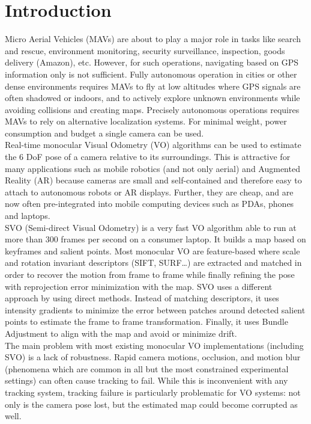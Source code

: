 \chapter{Introduction}\label{sec:introduction}

Micro Aerial Vehicles (MAVs) are about to play a major role in tasks like search and rescue, environment monitoring, security surveillance, inspection, goods delivery (Amazon), etc.  However, for such operations, navigating based on GPS information only is not sufficient. Fully autonomous operation in cities or other dense environments requires MAVs to fly at low altitudes where GPS signals are often shadowed or indoors, and to actively explore unknown environments while avoiding collisions and creating maps. Precisely autonomous operations requires MAVs to rely on alternative localization systems. For minimal weight, power consumption and budget a single camera can be used.\\

Real-time monocular Visual Odometry (VO) algorithms can be used to estimate the 6 DoF pose of a camera relative to its surroundings. This is attractive for many applications such as mobile robotics (and not only aerial) and Augmented Reality (AR) because cameras are small and self-contained and therefore easy to attach to autonomous robots or AR displays. Further, they are cheap, and are now often pre-integrated into mobile computing devices such as PDAs, phones and laptops.\\

SVO (Semi-direct Visual Odometry) \cite{Forster2014} is a very fast VO algorithm able to run at more than 300 frames per second on a consumer laptop. It builds a map based on keyframes and salient points. Most monocular VO are feature-based where scale and rotation invariant descriptors (SIFT, SURF\ldots) are extracted and matched in order to recover the motion from frame to frame while finally refining the pose with reprojection error minimization with the map. SVO uses a different approach by using direct methods. Instead of matching descriptors, it uses intensity gradients to minimize the error between patches around detected salient points to estimate the frame to frame transformation. Finally, it uses Bundle Adjustment to align with the map and avoid or minimize drift.\\

The main problem with most existing monocular VO implementations (including SVO) is a lack of robustness. Rapid camera motions, occlusion, and motion blur (phenomena which are common in all but the most constrained experimental settings) can often cause tracking to fail. While this is inconvenient with any tracking system, tracking failure is particularly problematic for VO systems: not only is the camera pose lost, but the estimated map could become corrupted as well. \\

